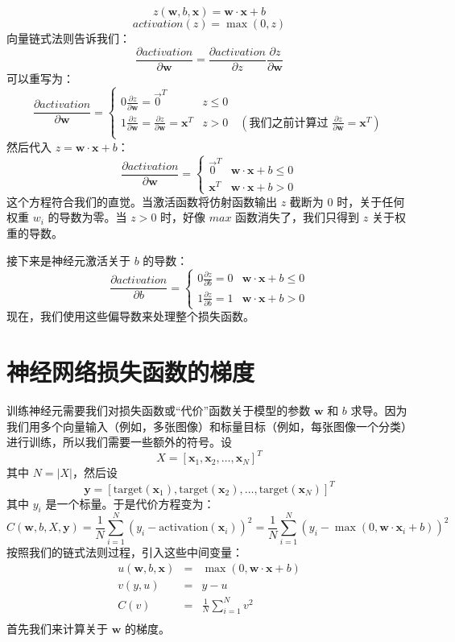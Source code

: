 \documentclass[11pt]{article}
\begin{document}
\[ z(\mathbf{w},b,\mathbf{x}) = \mathbf{w} \cdot \mathbf{x} + b \]
\[ activation(z) = \max(0,z) \]
向量链式法则告诉我们：
\[\frac{\partial activation}{\partial \mathbf{w}} = \frac{\partial activation}{\partial z} \frac{\partial z}{\partial \mathbf{w}}\]
可以重写为：
\[\frac{\partial activation}{\partial \mathbf{w}} = \begin{cases}
	0 \frac{\partial z}{\partial \mathbf{w}} = \vec{0}^T & z \leq 0 \\
	1 \frac{\partial z}{\partial \mathbf{w}} = \frac{\partial z}{\partial \mathbf{w}} = \mathbf{x}^T & z > 0 \quad (\text{我们之前计算过 } \frac{\partial z}{\partial \mathbf{w}} = \mathbf{x}^T) \\
\end{cases}\]
然后代入 $z = \mathbf{w} \cdot \mathbf{x} + b$：
\[\frac{\partial activation}{\partial \mathbf{w}} = \begin{cases}
	\vec{0}^T & \mathbf{w} \cdot \mathbf{x} + b \leq 0 \\
	\mathbf{x}^T & \mathbf{w} \cdot \mathbf{x} + b > 0
\end{cases}\]
这个方程符合我们的直觉。当激活函数将仿射函数输出 $z$ 截断为 0 时，关于任何权重 $w_i$ 的导数为零。当 $z > 0$ 时，好像 $max$ 函数消失了，我们只得到 $z$ 关于权重的导数。

接下来是神经元激活关于 $b$ 的导数：
\[\frac{\partial activation}{\partial b} = \begin{cases}
	0 \frac{\partial z}{\partial b} = 0 & \mathbf{w} \cdot \mathbf{x} + b \leq 0 \\
	1 \frac{\partial z}{\partial b} = 1 & \mathbf{w} \cdot \mathbf{x} + b > 0
\end{cases}\]
现在，我们使用这些偏导数来处理整个损失函数。


\section{神经网络损失函数的梯度}\label{sec6}

训练神经元需要我们对损失函数或“代价”函数关于模型的参数 $\mathbf{w}$ 和 $b$ 求导。因为我们用多个向量输入（例如，多张图像）和标量目标（例如，每张图像一个分类）进行训练，所以我们需要一些额外的符号。设
\[ X = [\mathbf{x}_1, \mathbf{x}_2, \ldots, \mathbf{x}_N]^T \]
其中 $N=|X|$，然后设
\[ \mathbf{y} = [\text{target}(\mathbf{x}_1), \text{target}(\mathbf{x}_2), \ldots, \text{target}(\mathbf{x}_N)]^T \]
其中 $y_i$ 是一个标量。于是代价方程变为：
\[ C(\mathbf{w},b,X,\mathbf{y}) = \frac{1}{N} \sum_{i=1}^{N} (y_i - \text{activation}(\mathbf{x}_i))^2 = \frac{1}{N} \sum_{i=1}^{N} (y_i - \max(0, \mathbf{w}\cdot\mathbf{x}_i+b))^2 \]
按照我们的链式法则过程，引入这些中间变量：
\[
\begin{array}{lllllllll} 
 u(\mathbf{w},b,\mathbf{x}) &=& \max(0, \mathbf{w}\cdot\mathbf{x}+b)\\
 v(y,u) &=& y - u\\
 C(v) &=& \frac{1}{N} \sum_{i=1}^N v^2\\
\end{array}
\]
首先我们来计算关于 $\mathbf{w}$ 的梯度。
\end{document}
